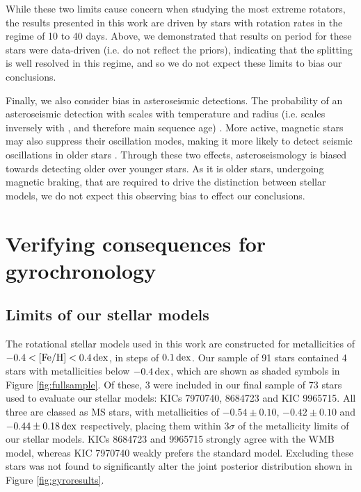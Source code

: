 While these two limits cause concern when studying the most extreme rotators, the results presented in this work are driven by stars with rotation rates in the regime of 10 to 40 days. Above, we demonstrated that results on period for these stars were data-driven (i.e. do not reflect the priors), indicating that the splitting is well resolved in this regime, and so we do not expect these limits to bias our conclusions.

Finally, we also consider bias in asteroseismic detections. The probability of an asteroseismic detection with \kepler scales with temperature and radius (i.e. scales inversely with \logg, and therefore main sequence age) \cite{m_chaplin+2011, m_schofield+2019}. More active, magnetic stars may also suppress their oscillation modes, making it more likely to detect seismic oscillations in older stars \cite{m_mathur+2019}. Through these two effects, asteroseismology is biased towards detecting older over younger stars. As it is older stars, undergoing magnetic braking, that are required to drive the distinction between stellar models, we do not expect this observing bias to effect our conclusions.

\section{Verifying consequences for gyrochronology}
\subsection{Limits of our stellar models}\label{ssec:limits}
The rotational stellar models used in this work \cite{m_vansaders+2019} are constructed for metallicities of $-0.4 < \rm{[Fe/H]} < 0.4\, \rm{dex}$, in steps of $0.1\, \rm {dex}$. Our sample of 91 stars contained 4 stars with metallicities below $-0.4\, \rm{dex}$, which are shown as shaded symbols in Figure \ref{fig:fullsample}. Of these, 3 were included in our final sample of 73 stars used to evaluate our stellar models: KICs 7970740, 8684723 and KIC 9965715. All three are classed as MS stars, with metallicities of $-0.54 \pm 0.10$, $-0.42 \pm 0.10$ and $-0.44 \pm 0.18\, \rm {dex}$ respectively, placing them within $3\sigma$ of the metallicity limits of our stellar models. KICs 8684723 and 9965715 strongly agree with the WMB model, whereas KIC 7970740 weakly prefers the standard model. Excluding these stars was not found to significantly alter the joint posterior distribution shown in Figure \ref{fig:gyroresults}.

